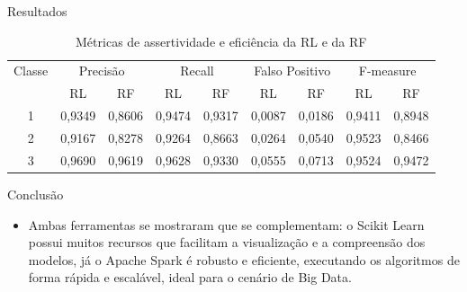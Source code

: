 \documentclass[final,hyperref={pdfpagelabels=false, brazil}]{beamer}
\let\olditem=\item%
\renewcommand{\item}{\olditem \justifying}%
\begin{document}
\begin{frame}[t]
\begin{columns}[t]
\begin{column}{.465\textwidth}
\begin{block}{Resultados}
\begin{itemize}
\begin{itemize}

\begin{table}
\centering
        \caption{Métricas de assertividade e eficiência da RL e da RF}
        \label{multiprogram}
        \begin{tabular}{c | c c | c c | c c|c c } \toprule
             Classe & \multicolumn{2}{|c|}{Precisão} & \multicolumn{2}{|c|}{Recall} & \multicolumn{2}{|c|}{Falso Positivo} & \multicolumn{2}{|c}{F-measure}\\
            \cline{2-9}
             & RL & RF & RL & RF & RL & RF & RL & RF \\
             \hline
            \multicolumn{1}{c|}{1} & 0,9349 & 0,8606 & 0,9474 & 0,9317 & 0,0087 &  0,0186 & 0,9411 & 0,8948\\
            \multicolumn{1}{c|}{2} & 0,9167 & 0,8278 & 0,9264 & 0,8663 & 0,0264 & 0,0540 & 0,9523 & 0,8466\\
            \multicolumn{1}{c|}{3} & 0,9690 & 0,9619 & 0,9628 & 0,9330 & 0,0555 & 0,0713 & 0,9524 & 0,9472\\\bottomrule
        \end{tabular}
    \end{table}


\end{itemize}
\end{itemize}
\end{block}


\begin{block}{Conclus\~ao}

\begin{itemize}
\item Ambas ferramentas se mostraram que se complementam: o Scikit Learn possui muitos recursos que facilitam a visualização e a compreensão dos modelos, já o Apache Spark é robusto e eficiente, executando os algoritmos de forma rápida e escalável, ideal para o cenário de Big Data.


\end{itemize}
\end{block}
\end{column}
\end{columns}
\end{frame}
\end{document}
